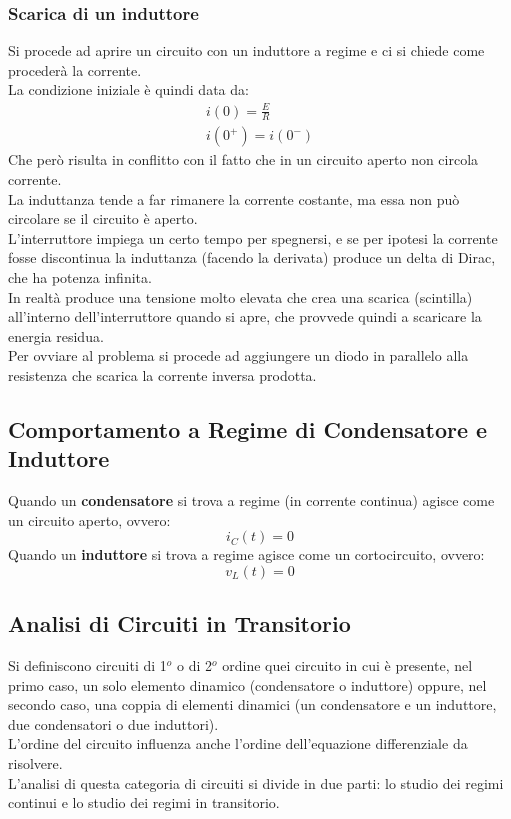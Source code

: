 \documentclass[../main.tex]{subfiles}
\begin{document}
	\subsubsection{Scarica di un induttore}
	Si procede ad aprire un circuito con un induttore a regime e ci si chiede come procederà la corrente.\\
	La condizione iniziale è quindi data da:
	\begin{gather}
		i(0)=\frac{E}{R} \\
		i(0^+)=i(0^-)	
	\end{gather}
	Che però risulta in conflitto con il fatto che in un circuito aperto non circola corrente. \\
	La induttanza tende a far rimanere la corrente costante, ma essa non può circolare se il circuito è aperto.\\
	L'interruttore impiega un certo tempo per spegnersi, e se per ipotesi la corrente fosse discontinua la induttanza (facendo la derivata) produce un delta di Dirac, che ha potenza infinita. \\
	In realtà produce una tensione molto elevata che crea una scarica (scintilla) all'interno dell'interruttore quando si apre, che provvede quindi a scaricare la energia residua.\\
	Per ovviare al problema si procede ad aggiungere un diodo in parallelo alla resistenza che scarica la corrente inversa prodotta.
	\subsection{Comportamento a Regime di Condensatore e Induttore}
	Quando un \textbf{condensatore} si trova a regime (in corrente continua) agisce come un circuito aperto, ovvero:
	\begin{equation}
		i_C(t) = 0
	\end{equation}
	Quando un \textbf{induttore} si trova a regime agisce come un cortocircuito, ovvero:
	\begin{equation}
		v_L(t) = 0
	\end{equation}
	\subsection{Analisi di Circuiti in Transitorio}
	Si definiscono circuiti di 1$^o$ o di 2$^o$ ordine quei circuito in cui è presente, nel primo caso, un solo elemento dinamico (condensatore o induttore) oppure, nel secondo caso, una coppia di elementi dinamici (un condensatore e un induttore, due condensatori o due induttori).\\
	L'ordine del circuito influenza anche l'ordine dell'equazione differenziale da risolvere.\\
	L’analisi di questa categoria di circuiti si divide in due parti: lo studio dei regimi continui e lo studio dei regimi in transitorio.
\end{document}
